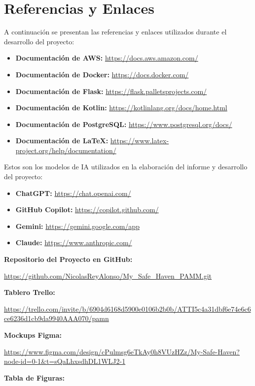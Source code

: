 \section{Referencias y Enlaces}
A continuación se presentan las referencias y enlaces utilizados durante el desarrollo del proyecto:
\begin{itemize}
    \item \textbf{Documentación de AWS:} \url{https://docs.aws.amazon.com/}
    \item \textbf{Documentación de Docker:} \url{https://docs.docker.com/}
    \item \textbf{Documentación de Flask:} \url{https://flask.palletsprojects.com/}
    \item \textbf{Documentación de Kotlin:} \url{https://kotlinlang.org/docs/home.html}
    \item \textbf{Documentación de PostgreSQL:} \url{https://www.postgresql.org/docs/}
    \item \textbf{Documentación de LaTeX:} \url{https://www.latex-project.org/help/documentation/}
\end{itemize}
Estos son los modelos de IA utilizados en la elaboración del informe y desarrollo del proyecto:
\begin{itemize}
    \item \textbf{ChatGPT:} \url{https://chat.openai.com/}
    \item \textbf{GitHub Copilot:} \url{https://copilot.github.com/}
    \item \textbf{Gemini:} \url{https://gemini.google.com/app}
    \item \textbf{Claude:} \url{https://www.anthropic.com/}
\end{itemize}
\textbf{Repositorio del Proyecto en GitHub:} 
\begin{center}
    \url{https://github.com/NicolasReyAlonso/My_Safe_Haven_PAMM.git}
\end{center}
\textbf{Tablero Trello:} 
\begin{center}
    \url{https://trello.com/invite/b/6904d6168d5900e0106b2b0b/ATTI5c4a31dbf6e74e6c6ce6236d1cb9da9940AAA070/pamn}
\end{center}
\textbf{Mockups Figma:} 
\begin{center}
    \url{https://www.figma.com/design/cPulmsg6eTkAy0h8VUzHZz/My-Safe-Haven?node-id=0-1&t=sQaLhxsdhDL1WLJ2-1}
\end{center}
\textbf{Tabla de Figuras:}
\listoffigures
\listoftables
\lstlistoflistings